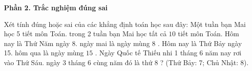 \textbf{Phần 2. Trắc nghiệm đúng sai}

\begin{ex} %
Xét tính đúng hoặc sai của các khẳng định toán học sau đây:
\choiceTF
{\True Một tuần bạn Mai học 5 tiết môn Toán. trong 2 tuần bạn Mai học tất cả $10$ tiết môn Toán.}
{Hôm nay là Thứ Năm ngày 8. ngày mai là ngày mùng $8$ .}
{Hôm nay là Thứ Bảy ngày 15. hôm qua là ngày mùng $15$ .}
{\True Ngày Quốc tế Thiếu nhi 1 tháng 6 năm nay rơi vào Thứ Sáu. ngày 3 tháng 6 cùng năm đó là thứ $8$ ? (Thứ Bảy: 7; Chủ Nhật: 8).}
\end{ex}

